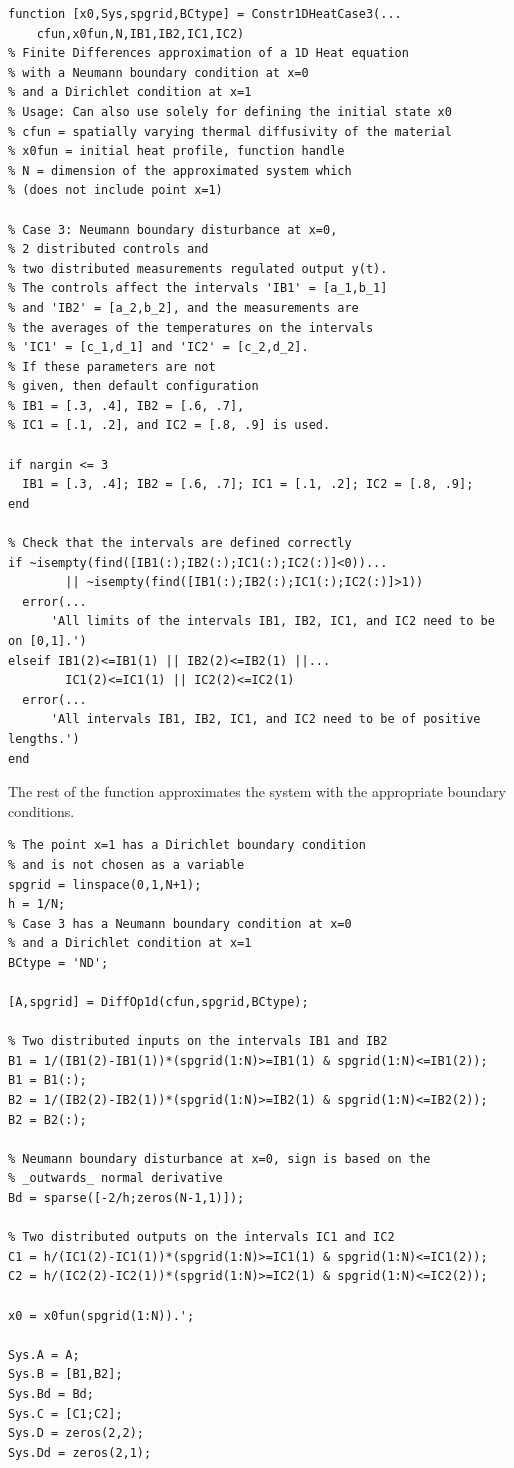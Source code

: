 \documentclass[11pt, a4paper]{amsart}
\theoremstyle{definition}
\numberwithin{equation}{section}
\begin{document}
\begin{lstlisting}
function [x0,Sys,spgrid,BCtype] = Constr1DHeatCase3(...
    cfun,x0fun,N,IB1,IB2,IC1,IC2)
% Finite Differences approximation of a 1D Heat equation
% with a Neumann boundary condition at x=0
% and a Dirichlet condition at x=1
% Usage: Can also use solely for defining the initial state x0
% cfun = spatially varying thermal diffusivity of the material
% x0fun = initial heat profile, function handle
% N = dimension of the approximated system which
% (does not include point x=1)

% Case 3: Neumann boundary disturbance at x=0,
% 2 distributed controls and 
% two distributed measurements regulated output y(t).
% The controls affect the intervals 'IB1' = [a_1,b_1]
% and 'IB2' = [a_2,b_2], and the measurements are
% the averages of the temperatures on the intervals 
% 'IC1' = [c_1,d_1] and 'IC2' = [c_2,d_2].
% If these parameters are not
% given, then default configuration 
% IB1 = [.3, .4], IB2 = [.6, .7], 
% IC1 = [.1, .2], and IC2 = [.8, .9] is used.

if nargin <= 3
  IB1 = [.3, .4]; IB2 = [.6, .7]; IC1 = [.1, .2]; IC2 = [.8, .9];
end

% Check that the intervals are defined correctly
if ~isempty(find([IB1(:);IB2(:);IC1(:);IC2(:)]<0))...
        || ~isempty(find([IB1(:);IB2(:);IC1(:);IC2(:)]>1))
  error(...
      'All limits of the intervals IB1, IB2, IC1, and IC2 need to be on [0,1].')
elseif IB1(2)<=IB1(1) || IB2(2)<=IB2(1) ||...
        IC1(2)<=IC1(1) || IC2(2)<=IC2(1)
  error(...
      'All intervals IB1, IB2, IC1, and IC2 need to be of positive lengths.')
end
  \end{lstlisting}

The rest of the function approximates the system with the appropriate boundary conditions.

\begin{lstlisting}
% The point x=1 has a Dirichlet boundary condition
% and is not chosen as a variable
spgrid = linspace(0,1,N+1);
h = 1/N;
% Case 3 has a Neumann boundary condition at x=0
% and a Dirichlet condition at x=1
BCtype = 'ND';

[A,spgrid] = DiffOp1d(cfun,spgrid,BCtype);

% Two distributed inputs on the intervals IB1 and IB2
B1 = 1/(IB1(2)-IB1(1))*(spgrid(1:N)>=IB1(1) & spgrid(1:N)<=IB1(2));
B1 = B1(:);
B2 = 1/(IB2(2)-IB2(1))*(spgrid(1:N)>=IB2(1) & spgrid(1:N)<=IB2(2));
B2 = B2(:);

% Neumann boundary disturbance at x=0, sign is based on the
% _outwards_ normal derivative
Bd = sparse([-2/h;zeros(N-1,1)]); 

% Two distributed outputs on the intervals IC1 and IC2
C1 = h/(IC1(2)-IC1(1))*(spgrid(1:N)>=IC1(1) & spgrid(1:N)<=IC1(2));
C2 = h/(IC2(2)-IC2(1))*(spgrid(1:N)>=IC2(1) & spgrid(1:N)<=IC2(2));

x0 = x0fun(spgrid(1:N)).';

Sys.A = A;
Sys.B = [B1,B2];
Sys.Bd = Bd;
Sys.C = [C1;C2];
Sys.D = zeros(2,2);
Sys.Dd = zeros(2,1);
  \end{lstlisting}
\end{document}
